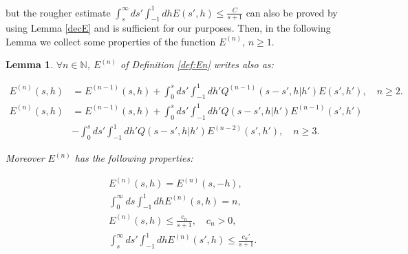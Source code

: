 \documentclass[a4paper,10pt,reqno]{amsart}
\newtheorem{lemma}{Lemma}[section]
\numberwithin{equation}{subsection}
\numberwithin{figure}{subsection}
\begin{document}
but the rougher estimate $\int_s^{\infty}ds'\int_{-1}^1dhE(s',h)\leq\frac{C}{s+1}$ can also be proved by using Lemma \ref{decE} and is sufficient for our purposes.
Then, in the following Lemma we collect some properties of the function $E^{(n)}$, $n\geq1$.
\begin{lemma}\label{proprEn}
$\forall n\in\mathbb{N}$, $E^{(n)}$ of Definition \ref{def:En} writes also as:

\begin{align}
\label{espr:En1} E^{(n)}(s,h)&=E^{(n-1)}(s,h)+\int_0^sds'\int_{-1}^1dh'Q^{(n-1)}(s-s',h|h')E(s',h'),\quad n\geq2.
\\
\nonumber E^{(n)}(s,h)&=E^{(n-1)}(s,h)+\int_0^sds'\int_{-1}^1dh'Q(s-s',h|h')E^{(n-1)}(s',h')
\\
\label{espr:En2}&-\int_0^sds'\int_{-1}^1dh'Q(s-s',h|h')E^{(n-2)}(s',h'),\quad n\geq 3.
\end{align}

Moreover $E^{(n)}$ has the following properties: 

\begin{align}
\label{Ensimm}&E^{(n)}(s,h)=E^{(n)}(s,-h),
\\
\label{intEn}&\int_0^{\infty}ds\int_{-1}^1dhE^{(n)}(s,h)=n,
\\
\label{ubEn}&E^{(n)}(s,h)\leq \frac{c_n}{s+1},\quad c_n>0,
\\
\label{restoEn}&\int_s^{\infty}ds'\int_{-1}^1dhE^{(n)}(s',h)\leq\frac{c_n'}{s+1}.
\end{align}

\end{lemma}
\end{document}
